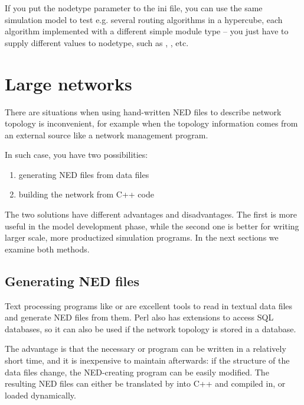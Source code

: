 If you put the nodetype parameter to the ini file, you can use the
same simulation model to test e.g. several routing algorithms in a
hypercube, each algorithm implemented with a different
simple module type -- you just have to supply
different values to nodetype, such as ,
, etc.



\section{Large networks}

There are situations when using hand-written NED files to describe
network topology is inconvenient, for example when
the topology information comes from
an external source like
a network management program.

In such case, you have two possibilities:

\begin{enumerate}
  \item{generating NED files from data files}
  \item{building the network from C++ code}
\end{enumerate}

The two solutions have different advantages and disadvantages.
The first is more useful in the model development phase, while
the second one is better for writing larger scale, more productized
simulation programs. In the next sections we examine both methods.



\subsection{Generating NED files}


Text processing programs like  or  are
excellent tools to read in textual data files and generate NED files
from them.  Perl also has extensions to
access SQL databases, so it can also be used if the network topology
is stored in a database.

The advantage is that the necessary  or 
program can be written in a relatively short time, and it is
inexpensive to maintain afterwards: if the structure of the data files
change, the NED-creating program can be easily modified. The
resulting NED files can either be translated by 
into C++ and compiled in, or loaded dynamically.


